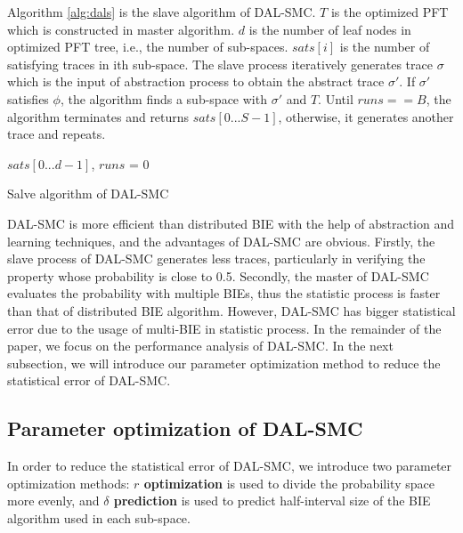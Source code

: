 Algorithm \ref{alg:dals} is the slave algorithm of DAL-SMC. $T$ is the optimized PFT which is constructed in master algorithm. $d$ is the number of leaf nodes in optimized PFT tree, i.e., the number of sub-spaces. $sats[i]$ is the number of satisfying traces in ith sub-space. The slave process iteratively generates trace $\sigma$ which is the input of abstraction process to obtain the abstract trace $\sigma'$. If $\sigma'$ satisfies $\phi$, the algorithm finds a sub-space with $\sigma'$ and $T$. Until $runs == B$, the algorithm terminates and returns $sats[0...S-1]$, otherwise, it generates another trace and repeats.
\begin{algorithm}[t]
{}
$sats[0...d-1]$, $runs$ = 0\;
\caption{Salve algorithm of DAL-SMC}
\label{alg:dals}
\end{algorithm}
DAL-SMC is more efficient than distributed BIE with the help of abstraction and learning techniques, and the advantages of DAL-SMC are obvious. Firstly, the slave process of DAL-SMC generates less traces, particularly in verifying the property whose probability is close to 0.5. Secondly, the master of DAL-SMC evaluates the probability with multiple BIEs, thus the statistic process is faster than that of distributed BIE algorithm. However, DAL-SMC has bigger statistical error due to the usage of multi-BIE in statistic process. In the remainder of the paper, we focus on the performance analysis of DAL-SMC.  In the next subsection, we will introduce our parameter optimization method to reduce the statistical error of DAL-SMC. 
\subsection{Parameter optimization of DAL-SMC}
In order to reduce the statistical error of DAL-SMC, we introduce two parameter optimization methods: \textbf{$r$ optimization} is used to divide the probability space more evenly, and \textbf{$\delta$ prediction} is used to predict half-interval size of the BIE algorithm used in each sub-space.

